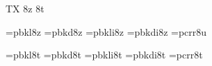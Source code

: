 
\ifx\ffdecl\undefined  \fi

\ffdecl [Bookman] {\caps{\rm\bf}} {\rm \bf \it \bi} {} {TX} {8z 8t}

\def\caps{\ffvars{l}{d}{!}{!}\ffsetV{caps}{c}\ffsetX} 
\def\nocaps{\ffsetX} 
\nocaps\relax %
\def\ffwarning#1{\ffmessage{FONT warning: Bookman - \string\caps#1 unavailable}}

\ismacro{}\ifttrue
   \font\tenrm=pbkl8z   \sizespec
   \font\tenbf=pbkd8z   \sizespec
   \font\tenit=pbkli8z  \sizespec
   \font\tenbi=pbkdi8z  \sizespec
   \font\tentt=pcrr8u   \sizespec
   \let\tensl=\tenit

   \def\ffnamegen{pbk\ffvarV\capsV 8z}

   
\fi

\ismacro{}\ifttrue
   \font\tenrm=pbkl8t   \sizespec
   \font\tenbf=pbkd8t   \sizespec
   \font\tenit=pbkli8t  \sizespec
   \font\tenbi=pbkdi8t  \sizespec
   \font\tentt=pcrr8t   \sizespec
   \let\tensl=\tenit

   \def\ffnamegen{pbk\ffvarV\capsV 8t}
\fi

\tenrm

\let\setsimplemath=\relax %

\def\bmTeX{T\kern-.14em\lower.4ex\hbox{E}\kern-.125emX}
\ifx\origTeX\undefined \let\origTeX=\TeX \fi
\let\TeX=\bmTeX

\ifx\loadmathfonts\relax \endinput \fi
\ifx\mathpreloaded X\else  \fi                     


